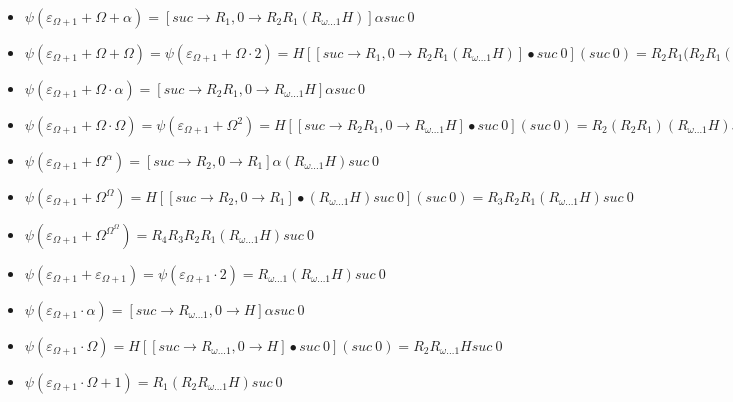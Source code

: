 \documentclass[10pt]{article}
\begin{document}
\begin{itemize}
\item \( \psi(\varepsilon_{\Omega+1}+\Omega+\alpha) = [suc \rightarrow R_1, 0 \rightarrow R_2 R_1 (R_{\omega \ldots 1} H)] \alpha suc\ 0 \)

\item \( \psi(\varepsilon_{\Omega+1}+\Omega+\Omega) = \psi(\varepsilon_{\Omega+1}+\Omega \cdot 2) = H [[suc \rightarrow R_1, 0 \rightarrow R_2 R_1 (R_{\omega \ldots 1} H)] \bullet suc\ 0] (suc\ 0) = R_2 R_1 (R_2 R_1 (R_{\omega \ldots 1} H) suc\ 0 \)

\item \( \psi(\varepsilon_{\Omega+1}+\Omega \cdot \alpha) = [suc \rightarrow R_2 R_1, 0 \rightarrow R_{\omega \ldots 1} H] \alpha suc\ 0 \) 

\item \( \psi(\varepsilon_{\Omega+1}+\Omega \cdot \Omega) = \psi(\varepsilon_{\Omega+1}+\Omega^2) = H [[suc \rightarrow R_2 R_1, 0 \rightarrow R_{\omega \ldots 1} H] \bullet suc\ 0] (suc\ 0) = R_2 (R_2 R_1) (R_{\omega \ldots 1} H) suc\ 0 \) 

\item \( \psi(\varepsilon_{\Omega+1}+\Omega^\alpha) = [suc \rightarrow R_2, 0 \rightarrow R_1] \alpha (R_{\omega \ldots 1} H) suc\ 0 \)

\item \( \psi(\varepsilon_{\Omega+1}+\Omega^\Omega) = H [[suc \rightarrow R_2, 0 \rightarrow R_1] \bullet (R_{\omega \ldots 1} H) suc\ 0] (suc\ 0) = R_3 R_2 R_1 (R_{\omega \ldots 1} H) suc\ 0 \)

\item \( \psi(\varepsilon_{\Omega+1}+\Omega^{\Omega^\Omega}) = R_4 R_3 R_2 R_1 (R_{\omega \ldots 1} H) suc\ 0 \)

\item \( \psi(\varepsilon_{\Omega+1}+\varepsilon_{\Omega+1}) = \psi(\varepsilon_{\Omega+1} \cdot 2) = R_{\omega \ldots 1} (R_{\omega \ldots 1} H) suc\ 0 \)

\item \( \psi(\varepsilon_{\Omega+1} \cdot \alpha) = [suc \rightarrow R_{\omega \ldots 1}, 0 \rightarrow H] \alpha suc\ 0 \)

\item \( \psi(\varepsilon_{\Omega+1} \cdot \Omega) = H [[suc \rightarrow R_{\omega \ldots 1}, 0 \rightarrow H] \bullet suc\ 0] (suc\ 0) = R_2 R_{\omega \ldots 1} H suc\ 0 \)


\item \( \psi(\varepsilon_{\Omega+1} \cdot \Omega+1) = R_1 (R_2 R_{\omega \ldots 1} H) suc\ 0 \)


\end{itemize}
\end{document}
